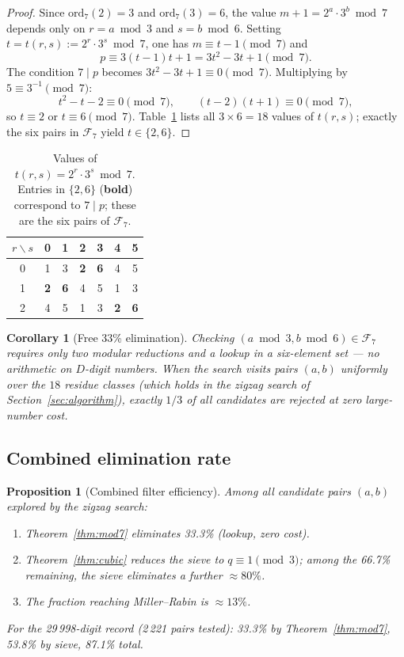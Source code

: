 \documentclass[11pt,a4paper]{article}
\theoremstyle{plain}
\newtheorem{proposition}[theorem]{Proposition}
\newtheorem{corollary}[theorem]{Corollary}
\theoremstyle{definition}
\begin{document}
\begin{proof}
Since $\mathrm{ord}_7(2) = 3$ and $\mathrm{ord}_7(3) = 6$, the value
$m + 1 = 2^a \cdot 3^b \bmod 7$ depends only on $r = a \bmod 3$ and
$s = b \bmod 6$. Setting $t = t(r, s) := 2^r \cdot 3^s \bmod 7$, one has
$m \equiv t - 1 \pmod{7}$ and
\[
p \equiv 3(t-1)t + 1 = 3t^2 - 3t + 1 \pmod{7}.
\]
The condition $7 \mid p$ becomes $3t^2 - 3t + 1 \equiv 0 \pmod{7}$.
Multiplying by $5 \equiv 3^{-1} \pmod{7}$:
\[
t^2 - t - 2 \equiv 0 \pmod{7}, \qquad (t-2)(t+1) \equiv 0 \pmod{7},
\]
so $t \equiv 2$ or $t \equiv 6 \pmod{7}$. Table~\ref{tab:t-rs} lists all
$3 \times 6 = 18$ values of $t(r, s)$; exactly the six pairs in $\mathcal{F}_7$
yield $t \in \{2, 6\}$.
\end{proof}

\begin{table}[ht]
\centering
\caption{Values of $t(r, s) = 2^r \cdot 3^s \bmod 7$. Entries in $\{2, 6\}$
(\textbf{bold}) correspond to $7 \mid p$; these are the six pairs of
$\mathcal{F}_7$.}
\label{tab:t-rs}
\begin{tabular}{c|cccccc}
\toprule
$r \backslash s$ & 0 & 1 & 2 & 3 & 4 & 5 \\
\midrule
0 & 1 & 3 & \textbf{2} & \textbf{6} & 4 & 5 \\
1 & \textbf{2} & \textbf{6} & 4 & 5 & 1 & 3 \\
2 & 4 & 5 & 1 & 3 & \textbf{2} & \textbf{6} \\
\bottomrule
\end{tabular}
\end{table}

\begin{corollary}[Free 33\% elimination]\label{cor:mod7}
Checking $(a \bmod 3, b \bmod 6) \in \mathcal{F}_7$ requires only two modular
reductions and a lookup in a six-element set --- no arithmetic on $D$-digit
numbers. When the search visits pairs $(a, b)$ uniformly over the $18$
residue classes (which holds in the zigzag search of
Section~\ref{sec:algorithm}), exactly $1/3$ of all candidates are rejected
at zero large-number cost.
\end{corollary}

\subsection{Combined elimination rate}

\begin{proposition}[Combined filter efficiency]\label{prop:combined}
Among all candidate pairs $(a, b)$ explored by the zigzag search:
\begin{enumerate}[leftmargin=*,label=(\roman*)]
\item Theorem~\ref{thm:mod7} eliminates 33.3\% (lookup, zero cost).
\item Theorem~\ref{thm:cubic} reduces the sieve to $q \equiv 1 \pmod{3}$;
among the 66.7\% remaining, the sieve eliminates a further $\approx 80\%$.
\item The fraction reaching Miller--Rabin is $\approx 13\%$.
\end{enumerate}
For the 29\,998-digit record (2\,221 pairs tested): 33.3\% by
Theorem~\ref{thm:mod7}, 53.8\% by sieve, 87.1\% total.
\end{proposition}
\end{document}
